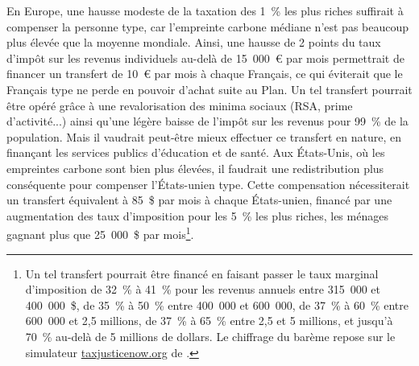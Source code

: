 \documentclass[a5paper,french,openany]{memoir}
\begin{document}
En Europe, une hausse modeste de la taxation des 1~\% les plus riches suffirait à compenser la personne type, car l'empreinte carbone médiane n'est pas beaucoup plus élevée que la moyenne mondiale. Ainsi, une hausse de 2 points du taux d'impôt sur les revenus individuels au-delà de 15~000~\euro{} par mois permettrait de financer un transfert de 10~\euro{} par mois à chaque Français, ce qui éviterait que le Français type ne perde en pouvoir d'achat suite au Plan. Un tel transfert pourrait être opéré grâce à une revalorisation des minima sociaux (RSA, prime d'activité...) ainsi qu'une légère baisse de l'impôt sur les revenus pour 99~\% de la population. Mais il vaudrait peut-être mieux effectuer ce transfert en nature, en finançant les services publics d'éducation et de santé. Aux États-Unis, où les empreintes carbone sont bien plus élevées, il faudrait une redistribution plus conséquente pour compenser l'États-unien type. Cette compensation nécessiterait un transfert équivalent à 85~\$ par mois à chaque États-unien, financé par une augmentation des taux d'imposition pour les 5~\% les plus riches, les ménages gagnant plus que 25~000~\$ par mois\footnote{Un tel transfert pourrait être financé en faisant passer le taux marginal d'imposition de 32~\% à 41~\% pour les revenus annuels entre 315~000 et 400~000~\$, de 35~\% à 50~\% entre 400~000 et 600~000, de 37~\% à 60~\% entre 600~000 et 2,5 millions, de 37~\% à 65~\% entre 2,5 et 5 millions, et jusqu'à 70~\% au-delà de 5 millions de dollars. Le chiffrage du barème repose sur le simulateur \href{https://taxjusticenow.org/}{taxjusticenow.org} de \cite{saez_triumph_2019}.}.


\end{document}
